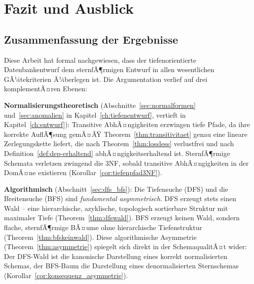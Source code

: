 ﻿\documentclass[a4paper,12pt]{report}
\theoremstyle{definition}
\theoremstyle{remark}
\begin{document}

\chapter{Fazit und Ausblick}
\label{ch:ausblick}

\section{Zusammenfassung der Ergebnisse}
\label{sec:fazit}

Diese Arbeit hat formal nachgewiesen, dass der tiefenorientierte
Datenbankentwurf dem sternfÃ¶rmigen Entwurf in allen wesentlichen
GÃ¼tekriterien Ã¼berlegen ist. Die Argumentation verlief auf drei
komplementÃ¤ren Ebenen:

\textbf{Normalisierungstheoretisch} (Abschnitte~\ref{sec:normalformen}
und~\ref{sec:anomalien} in Kapitel~\ref{ch:tiefenentwurf}, vertieft in
Kapitel~\ref{ch:entwurf}): Transitive AbhÃ¤ngigkeiten erzwingen tiefe
Pfade, da ihre korrekte AuflÃ¶sung gemÃ¤ÃŸ
Theorem~\ref{thm:transitivitaet} genau eine lineare Zerlegungskette
liefert, die nach Theorem~\ref{thm:lossless} verlustfrei und nach
Definition~\ref{def:dep-erhaltend} abhÃ¤ngigkeitserhaltend ist.
SternfÃ¶rmige Schemata verletzen zwingend die 3NF, sobald transitive
AbhÃ¤ngigkeiten in der DomÃ¤ne existieren (Korollar~\ref{cor:tiefenpfad3NF}).

\textbf{Algorithmisch} (Abschnitt~\ref{sec:dfs_bfs}): Die Tiefensuche
(DFS) und die Breitensuche (BFS) sind \emph{fundamental asymmetrisch}.
DFS erzeugt stets einen Wald -- eine hierarchische, azyklische,
topologisch sortierbare Struktur mit maximaler Tiefe
(Theorem~\ref{thm:dfswald}). BFS erzeugt keinen Wald, sondern flache,
sternfÃ¶rmige BÃ¤ume ohne hierarchische Tiefenstruktur
(Theorem~\ref{thm:bfskeinwald}). Diese algorithmische Asymmetrie
(Theorem~\ref{thm:asymmetrie}) spiegelt sich direkt in der
SchemaqualitÃ¤t wider: Der DFS-Wald ist die kanonische Darstellung eines
korrekt normalisierten Schemas, der BFS-Baum die Darstellung eines
denormalisierten Sternschemas (Korollar~\ref{cor:konsequenz_asymmetrie}).
\end{document}
